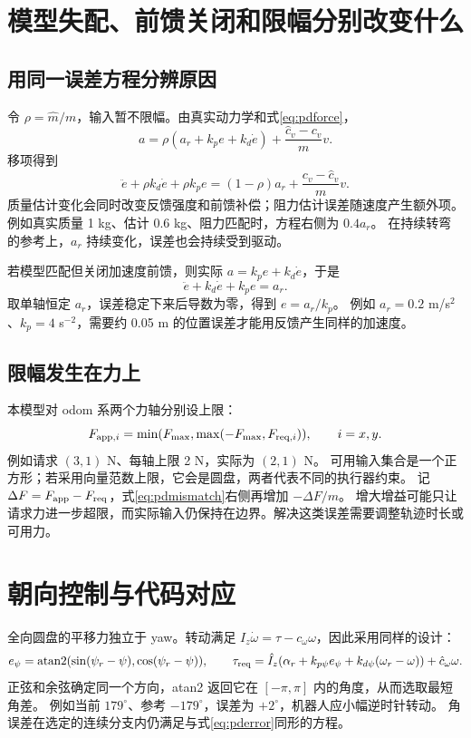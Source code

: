 \section{模型失配、前馈关闭和限幅分别改变什么}
\subsection{用同一误差方程分辨原因}
令 $\rho=\hat m/m$，输入暂不限幅。由真实动力学和式\eqref{eq:pdforce}，
\[
 a=\rho(a_r+k_pe+k_d\dot e)+\frac{\hat c_v-c_v}{m}v.
\]
移项得到
\begin{equation}
 \ddot e+\rho k_d\dot e+\rho k_pe
 =(1-\rho)a_r+\frac{c_v-\hat c_v}{m}v.\label{eq:pdmismatch}
\end{equation}
质量估计变化会同时改变反馈强度和前馈补偿；阻力估计误差随速度产生额外项。
例如真实质量 1 kg、估计 0.6 kg、阻力匹配时，方程右侧为 $0.4a_r$。
在持续转弯的参考上，$a_r$ 持续变化，误差也会持续受到驱动。

若模型匹配但关闭加速度前馈，则实际 $a=k_pe+k_d\dot e$，于是
\[
 \ddot e+k_d\dot e+k_pe=a_r.
\]
取单轴恒定 $a_r$，误差稳定下来后导数为零，得到 $e=a_r/k_p$。
例如 $a_r=0.2$ m/s$^2$、$k_p=4$ s$^{-2}$，需要约 0.05 m 的位置误差才能用反馈产生同样的加速度。

\subsection{限幅发生在力上}
本模型对 odom 系两个力轴分别设上限：
\[
 F_{{\rm app},i}=\min(F_{\max},\max(-F_{\max},F_{{\rm req},i})),\qquad i=x,y.
\]
例如请求 $(3,1)$ N、每轴上限 2 N，实际为 $(2,1)$ N。
可用输入集合是一个正方形；若采用向量范数上限，它会是圆盘，两者代表不同的执行器约束。
记 $\Delta F=F_{\rm app}-F_{\rm req}$，式\eqref{eq:pdmismatch}右侧再增加 $-\Delta F/m$。
增大增益可能只让请求力进一步超限，而实际输入仍保持在边界。解决这类误差需要调整轨迹时长或可用力。

\section{朝向控制与代码对应}
全向圆盘的平移力独立于 yaw。转动满足 $I_z\dot\omega=\tau-c_\omega\omega$，因此采用同样的设计：
\[
 e_\psi=\operatorname{atan2}(\sin(\psi_r-\psi),\cos(\psi_r-\psi)),\qquad
 \tau_{\rm req}=\hat I_z(\alpha_r+k_{p\psi}e_\psi+k_{d\psi}(\omega_r-\omega))+
 \hat c_\omega\omega.
\]
正弦和余弦确定同一个方向，atan2 返回它在 $[-\pi,\pi]$ 内的角度，从而选取最短角差。
例如当前 $179^\circ$、参考 $-179^\circ$，误差为 $+2^\circ$，机器人应小幅逆时针转动。
角误差在选定的连续分支内仍满足与式\eqref{eq:pderror}同形的方程。

